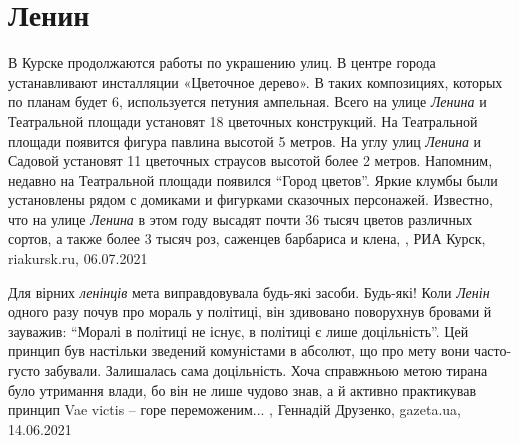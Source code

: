  
 
 
 
 
\chapter{Ленин}


В Курске продолжаются работы по украшению улиц. В центре города устанавливают
инсталляции «Цветочное дерево». В таких композициях, которых по планам будет 6,
используется петуния ампельная.  Всего на улице \emph{Ленина} и Театральной
площади установят 18 цветочных конструкций. На Театральной площади появится
фигура павлина высотой 5 метров. На углу улиц \emph{Ленина} и Садовой установят
11 цветочных страусов высотой более 2 метров.  Напомним, недавно на Театральной
площади появился \enquote{Город цветов}. Яркие клумбы были установлены рядом с
домиками и фигурками сказочных персонажей.  Известно, что на улице
\emph{Ленина} в этом году высадят почти 36 тысяч цветов различных сортов, а
также более 3 тысяч роз, саженцев барбариса и клена,
, РИА Курск, riakursk.ru, 06.07.2021

Для вірних \emph{ленінців} мета виправдовувала будь-які засоби. Будь-які! Коли \emph{Ленін}
одного разу почув про мораль у політиці, він здивовано поворухнув бровами й
зауважив: \enquote{Моралі в політиці не існує, в політиці є лише доцільність}. Цей
принцип був настільки зведений комуністами в абсолют, що про мету вони
часто-густо забували. Залишалась сама доцільність. Хоча справжньою метою тирана
було утримання влади, бо він не лише чудово знав, а й активно практикував
принцип Vae victis – горе переможеним...
, 
Геннадій Друзенко, gazeta.ua, 14.06.2021

